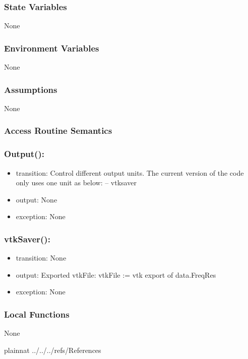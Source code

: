 \documentclass[12pt, titlepage]{article}
\begin{document}
\subsubsection{State Variables}
None

\subsubsection{Environment Variables}
None

\subsubsection{Assumptions}
None

\subsubsection{Access Routine Semantics}

\subsubsection*{Output():}
\begin{itemize}
	\item transition: Control different output units. The current version of the code only uses one unit as below: 
	\subitem -- vtksaver
	\item output: None
	\item exception: None
\end{itemize}

\subsubsection*{vtkSaver():}
\begin{itemize}
	\item transition: None
	\item output: Exported vtkFile:
	\subitem vtkFile := vtk export of data.FreqRes
	\item exception: None
\end{itemize}

\subsubsection{Local Functions}
 None
 
\newpage
%
%
%
%
%
%
%
%
%
%


 {plainnat}
 {../../../refs/References}



\end{document}
